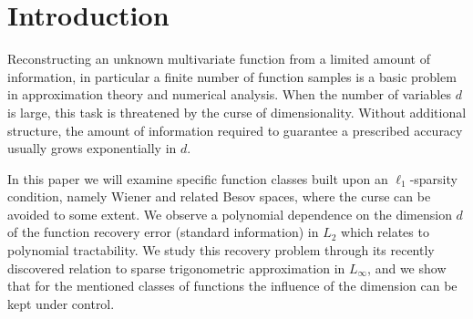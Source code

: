 \documentclass[11pt,reqno]{article}
\numberwithin{equation}{section}
\theoremstyle{definition}
\theoremstyle{plain}
\begin{document}
\begin{abstract} Recent findings by Jahn, T. Ullrich, Voigtlaender \cite{JUV23} relate non-linear sampling numbers for the square norm to quantities involving trigonometric best $m$-term approximation errors in the uniform norm. Here we establish new results for sparse trigonometric 
approximation in the high-dimensional setting, where the influence of the dimension $d$ has to be controlled. In particular, we focus on best $m$-term trigonometric approximation widths for (unweighted) Wiener classes in $L_q$ and give precise constants. Our main results are approximation guarantees where the number of terms $m$ scales at most quadratically in the inverse accuracy $1/\varepsilon$. Providing a refined version of the classical Nikol'skii inequality, we are able to extrapolate the $L_q$-result to $L_\infty$ while limiting the influence of the dimension mainly to a $\log$-term in the support size of the (rectangular) spectrum. This has consequences for the tractable sampling recovery via $\ell_1$-minimization of functions belonging to certain Besov classes with mixed smoothness and complements polynomial tractability results recently given by Krieg \cite{Kr23}.  
\end{abstract}


\section{Introduction} 


Reconstructing an unknown multivariate function from a limited amount of information, in particular a finite number of function samples is a basic problem in approximation theory and numerical analysis. When the number of variables $d$ is large, this task is threatened by the curse of dimensionality. Without additional structure, the amount of information required to guarantee a prescribed accuracy usually grows exponentially in $d$. 

In this paper we will examine specific function classes built upon an $\ell_1$-sparsity condition, namely Wiener and related Besov spaces, where the curse can be avoided to some extent. We observe a polynomial dependence on the dimension $d$ of the function recovery error (standard information) in $L_2$ which relates to polynomial tractability. We study this recovery problem through its recently discovered relation to sparse trigonometric approximation in $L_\infty$, and we show that for the mentioned classes  of functions the influence of the dimension can be kept under control.
\end{document}
